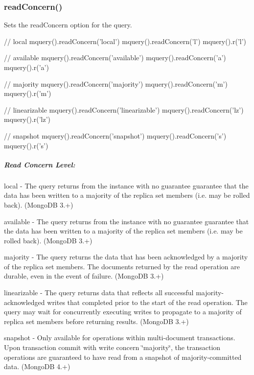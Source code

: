 \subsubsection*{read\+Concern()}

Sets the read\+Concern option for the query.


\begin{DoxyCode}
// local
mquery().readConcern('local')
mquery().readConcern('l')
mquery().r('l')

// available
mquery().readConcern('available')
mquery().readConcern('a')
mquery().r('a')

// majority
mquery().readConcern('majority')
mquery().readConcern('m')
mquery().r('m')

// linearizable
mquery().readConcern('linearizable')
mquery().readConcern('lz')
mquery().r('lz')

// snapshot
mquery().readConcern('snapshot')
mquery().readConcern('s')
mquery().r('s')
\end{DoxyCode}


\subparagraph*{Read Concern Level\+:}


\begin{DoxyItemize}
\item {\ttfamily local} -\/ The query returns from the instance with no guarantee guarantee that the data has been written to a majority of the replica set members (i.\+e. may be rolled back). (Mongo\+DB 3.+)
\item {\ttfamily available} -\/ The query returns from the instance with no guarantee guarantee that the data has been written to a majority of the replica set members (i.\+e. may be rolled back). (Mongo\+DB 3.+)
\item {\ttfamily majority} -\/ The query returns the data that has been acknowledged by a majority of the replica set members. The documents returned by the read operation are durable, even in the event of failure. (Mongo\+DB 3.+)
\item {\ttfamily linearizable} -\/ The query returns data that reflects all successful majority-\/acknowledged writes that completed prior to the start of the read operation. The query may wait for concurrently executing writes to propagate to a majority of replica set members before returning results. (Mongo\+DB 3.+)
\item {\ttfamily snapshot} -\/ Only available for operations within multi-\/document transactions. Upon transaction commit with write concern \char`\"{}majority\char`\"{}, the transaction operations are guaranteed to have read from a snapshot of majority-\/committed data. (Mongo\+DB 4.+)
\end{DoxyItemize}

